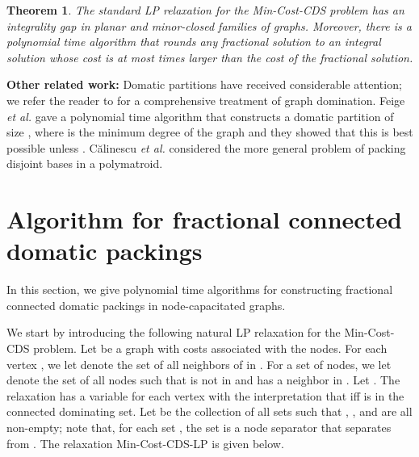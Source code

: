 \documentclass[11pt]{article}
\newtheorem{theorem}[lemma]{Theorem}
\def\etal{\emph{et al.}\xspace}
\def\mypar#1{{\medskip\noindent \textbf{#1}}}
\def\prob#1{\textsf{\textup{#1}}\xspace}
\def\minCDSlp{\prob{\minCDS-LP}}
\def\minCDS{\prob{Min-Cost-CDS}}
\begin{document}
\begin{theorem} \label{thm:cds-gap-minor-free}
	The standard LP relaxation for the \minCDS problem has an 
	integrality gap in planar and minor-closed families of graphs.
	Moreover, there is a polynomial time algorithm that rounds any
	fractional solution to an integral solution whose cost is at most
	 times larger than the cost of the fractional solution.
\end{theorem}

\vspace{-0.1in}
\mypar{Other related work:}
Domatic partitions have received considerable attention; we refer the
reader to \cite{HedetniemiL91, HaynesHS98a, HaynesHS98b} for a
comprehensive treatment of graph domination. Feige \etal
\cite{FeigeHKS02} gave a polynomial time algorithm that constructs a
domatic partition of size , where  is
the minimum degree of the graph and they showed that this is best
possible unless .
C\u{a}linescu \etal \cite{CalinescuCV09} considered the more general
problem of packing disjoint bases in a polymatroid.


\section{Algorithm for fractional connected domatic packings}
\label{sec:cds-packing}

In this section, we give polynomial time algorithms for constructing
fractional connected domatic packings in node-capacitated graphs.

We start by introducing the following natural LP relaxation for the
\minCDS problem. Let  be a graph with costs 
associated with the nodes. For each vertex , we let 
denote the set of all neighbors of  in . For a set  of
nodes, we let  denote the set of all nodes  such that
 is not in  and  has a neighbor in .  Let . The relaxation has a variable  for
each vertex  with the interpretation that  iff  is in
the connected dominating set. Let  be the collection of all sets
 such that , , and  are all
non-empty; note that, for each set , the set 
is a node separator that separates  from .
The relaxation \minCDSlp is given below.

\begin{center}
\begin{boxedminipage}{0.45\textwidth}
\vspace{-0.15in}

\end{boxedminipage}
\end{center}
\end{document}
